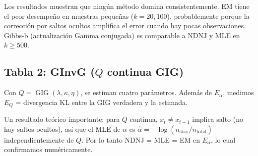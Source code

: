 \documentclass[12pt,letterpaper]{article}
\newcommand{\GIG}{\operatorname{GIG}}
\begin{document}
Los resultados muestran que ning\'{u}n m\'{e}todo domina consistentemente. EM tiene el peor desempe\~{n}o en muestras peque\~{n}as ($k=20, 100$), probablemente porque la correcci\'{o}n por saltos ocultos amplifica el error cuando hay pocas observaciones. Gibbs-b (actualizaci\'{o}n Gamma conjugada) es comparable a NDNJ y MLE en $k \geq 500$.

\subsection{Tabla 2: GInvG ($Q$ continua GIG)}

Con $Q = \GIG(\lambda, \kappa, \eta)$, se estiman cuatro par\'{a}metros. Adem\'{a}s de $E_\alpha$, medimos $E_Q$ = divergencia KL entre la GIG verdadera y la estimada.

Un resultado te\'{o}rico importante: para $Q$ continua, $x_t \neq x_{t-1}$ implica salto (no hay saltos ocultos), as\'{i} que el MLE de $\alpha$ es $\hat{\alpha} = -\log(n_{\text{stay}}/n_{\text{total}})$ independientemente de $Q$. Por lo tanto NDNJ = MLE = EM en $E_\alpha$, lo cual confirmamos num\'{e}ricamente.
\end{document}
